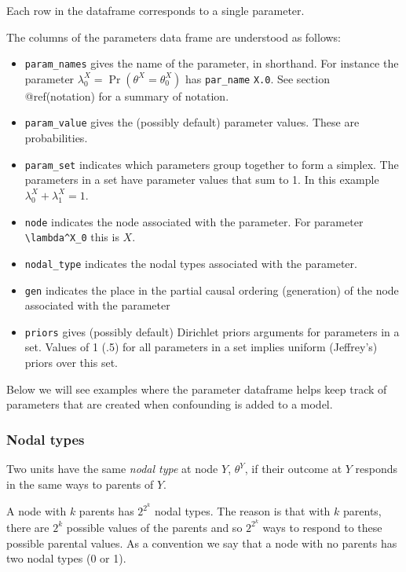 \documentclass[
  article]{jss}
\providecommand{\tightlist}{%
  \setlength{\itemsep}{0pt}\setlength{\parskip}{0pt}}\usepackage{longtable,booktabs,array}
\begin{document}
Each row in the dataframe corresponds to a single parameter.

The columns of the parameters data frame are understood as follows:

\begin{itemize}
\tightlist
\item
  \texttt{param\_names} gives the name of the parameter, in shorthand.
  For instance the parameter
  \(\lambda^X_0 = \Pr(\theta^X = \theta^X_0)\) has \texttt{par\_name}
  \texttt{X.0}. See section @ref(notation) for a summary of notation.
\item
  \texttt{param\_value} gives the (possibly default) parameter values.
  These are probabilities.\\
\item
  \texttt{param\_set} indicates which parameters group together to form
  a simplex. The parameters in a set have parameter values that sum to
  1. In this example \(\lambda^X_0 + \lambda^X_1 = 1\).
\item
  \texttt{node} indicates the node associated with the parameter. For
  parameter \texttt{\textbackslash{}lambda\^{}X\_0} this is \(X\).
\item
  \texttt{nodal\_type} indicates the nodal types associated with the
  parameter.
\item
  \texttt{gen} indicates the place in the partial causal ordering
  (generation) of the node associated with the parameter
\item
  \texttt{priors} gives (possibly default) Dirichlet priors arguments
  for parameters in a set. Values of 1 (.5) for all parameters in a set
  implies uniform (Jeffrey's) priors over this set.
\end{itemize}

Below we will see examples where the parameter dataframe helps keep
track of parameters that are created when confounding is added to a
model.

\hypertarget{nodal-types}{%
\subsubsection{Nodal types}\label{nodal-types}}

Two units have the same \emph{nodal type} at node \(Y\), \(\theta^Y\),
if their outcome at \(Y\) responds in the same ways to parents of \(Y\).

A node with \(k\) parents has \(2^{2^k}\) nodal types. The reason is
that with \(k\) parents, there are \(2^k\) possible values of the
parents and so \(2^{2^k}\) ways to respond to these possible parental
values. As a convention we say that a node with no parents has two nodal
types (0 or 1).
\end{document}
